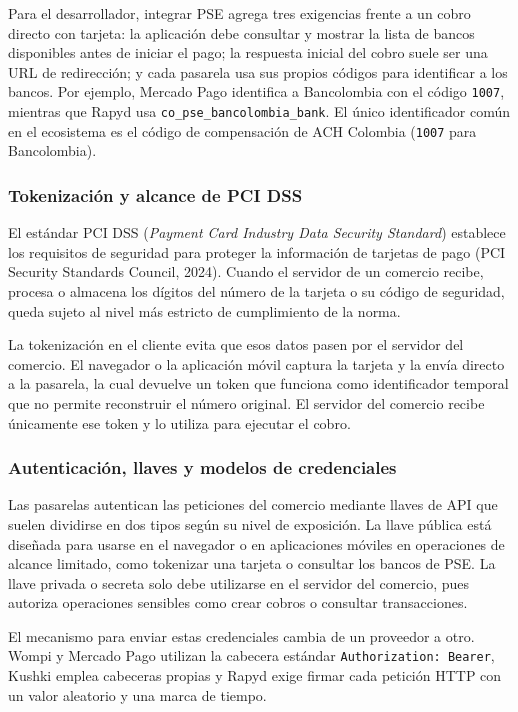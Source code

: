 Para el desarrollador, integrar PSE agrega tres exigencias frente a un cobro directo con tarjeta: la aplicación debe consultar y mostrar la lista de bancos disponibles antes de iniciar el pago; la respuesta inicial del cobro suele ser una URL de redirección; y cada pasarela usa sus propios códigos para identificar a los bancos. Por ejemplo, Mercado Pago identifica a Bancolombia con el código \texttt{1007}, mientras que Rapyd usa \texttt{co\_pse\_bancolombia\_bank}. El único identificador común en el ecosistema es el código de compensación de ACH Colombia (\texttt{1007} para Bancolombia).

\subsubsection{Tokenización y alcance de PCI DSS}
El estándar PCI DSS (\textit{Payment Card Industry Data Security Standard}) establece los requisitos de seguridad para proteger la información de tarjetas de pago (PCI Security Standards Council, 2024). Cuando el servidor de un comercio recibe, procesa o almacena los dígitos del número de la tarjeta o su código de seguridad, queda sujeto al nivel más estricto de cumplimiento de la norma.

La tokenización en el cliente evita que esos datos pasen por el servidor del comercio. El navegador o la aplicación móvil captura la tarjeta y la envía directo a la pasarela, la cual devuelve un token que funciona como identificador temporal que no permite reconstruir el número original. El servidor del comercio recibe únicamente ese token y lo utiliza para ejecutar el cobro.

\subsubsection{Autenticación, llaves y modelos de credenciales}
Las pasarelas autentican las peticiones del comercio mediante llaves de API que suelen dividirse en dos tipos según su nivel de exposición. La llave pública está diseñada para usarse en el navegador o en aplicaciones móviles en operaciones de alcance limitado, como tokenizar una tarjeta o consultar los bancos de PSE. La llave privada o secreta solo debe utilizarse en el servidor del comercio, pues autoriza operaciones sensibles como crear cobros o consultar transacciones.

El mecanismo para enviar estas credenciales cambia de un proveedor a otro. Wompi y Mercado Pago utilizan la cabecera estándar \texttt{Authorization: Bearer}, Kushki emplea cabeceras propias y Rapyd exige firmar cada petición HTTP con un valor aleatorio y una marca de tiempo.

